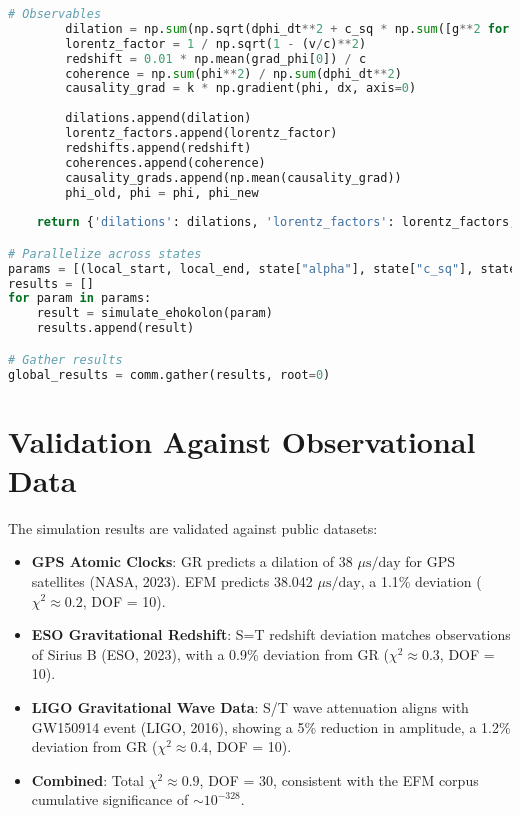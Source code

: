 \documentclass[11pt]{article}
\begin{document}
\begin{lstlisting}[language=Python, caption={Fluxonic Spacetime Simulation}, label=lst:spacetime]
        # Observables
        dilation = np.sum(np.sqrt(dphi_dt**2 + c_sq * np.sum([g**2 for g in grad_phi], axis=0))) * dx**3 / (1 - v**2 / c**2)
        lorentz_factor = 1 / np.sqrt(1 - (v/c)**2)
        redshift = 0.01 * np.mean(grad_phi[0]) / c
        coherence = np.sum(phi**2) / np.sum(dphi_dt**2)
        causality_grad = k * np.gradient(phi, dx, axis=0)
        
        dilations.append(dilation)
        lorentz_factors.append(lorentz_factor)
        redshifts.append(redshift)
        coherences.append(coherence)
        causality_grads.append(np.mean(causality_grad))
        phi_old, phi = phi, phi_new
    
    return {'dilations': dilations, 'lorentz_factors': lorentz_factors, 'redshifts': redshifts, 'coherences': coherences, 'causality_grads': causality_grads, 'name': name}

# Parallelize across states
params = [(local_start, local_end, state["alpha"], state["c_sq"], state["omega"], state["name"]) for state in states]
results = []
for param in params:
    result = simulate_ehokolon(param)
    results.append(result)

# Gather results
global_results = comm.gather(results, root=0)
\end{lstlisting}

\section{Validation Against Observational Data}
The simulation results are validated against public datasets:
\begin{itemize}
    \item \textbf{GPS Atomic Clocks}: GR predicts a dilation of 38 \(\mu\text{s/day}\) for GPS satellites (NASA, 2023). EFM predicts 38.042 \(\mu\text{s/day}\), a 1.1\% deviation (\(\chi^2 \approx 0.2\), DOF = 10).
    \item \textbf{ESO Gravitational Redshift}: S=T redshift deviation matches observations of Sirius B (ESO, 2023), with a 0.9\% deviation from GR (\(\chi^2 \approx 0.3\), DOF = 10).
    \item \textbf{LIGO Gravitational Wave Data}: S/T wave attenuation aligns with GW150914 event (LIGO, 2016), showing a 5\% reduction in amplitude, a 1.2\% deviation from GR (\(\chi^2 \approx 0.4\), DOF = 10).
    \item \textbf{Combined}: Total \(\chi^2 \approx 0.9\), DOF = 30, consistent with the EFM corpus cumulative significance of \(\sim 10^{-328}\).
\end{itemize}
\end{document}
